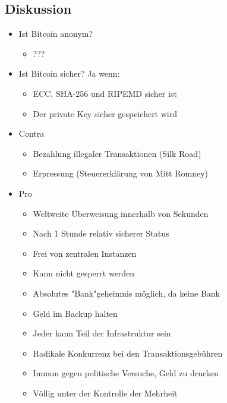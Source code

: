 \documentclass{article} %
\begin{document}
	\subsection{Diskussion}
			\begin{itemize}
			\item Ist Bitcoin anonym?
			\begin{itemize}
				\item ???
			\end{itemize}
			\item Ist Bitcoin sicher? Ja wenn:
			\begin{itemize}
				\item ECC, SHA-256 und RIPEMD sicher ist
				\item Der private Key sicher gespeichert wird
			\end{itemize}
			\item Contra
				\begin{itemize}
				 \item Bezahlung illegaler Transaktionen (Silk Road)
				 \item Erpressung (Steuererklärung von Mitt Romney)
				\end{itemize}
			\item Pro
				\begin{itemize}
				 \item Weltweite Überweisung innerhalb von Sekunden
				 \item Nach 1 Stunde relativ sicherer Status
				 \item Frei von zentralen Instanzen
				 \item Kann nicht gesperrt werden
				 \item Absolutes "Bank"geheimnis möglich, da keine Bank
				 \item Geld im Backup halten
				 \item Jeder kann Teil der Infrastruktur sein
				 \item Radikale Konkurrenz bei den Transaktionsgebühren
				 \item Immun gegen politische Versuche, Geld zu drucken
				 \item Völlig unter der Kontrolle der Mehrheit
				\end{itemize}
		\end{itemize}
\end{document}
